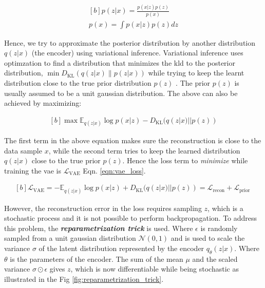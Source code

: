 \begin{equation}\label{eqn:pofx}
    \begin{gathered}[b]
        p(z | x)=\frac{p(x | z) p(z)}{p(x)} \\
        p(x)=\int p(x | z) p(z) dz
    \end{gathered}
\end{equation}

Hence, we try to approximate the posterior distribution by another distribution $q(z|x)$ (the encoder) using variational inference. Variational inference uses optimzation to find a distribution that minimizes the \ac{kld} to the posterior distribution, $\min D_{\mathrm{KL}}(q(z| x) \| p(z| x))$ while trying to keep the learnt distribution close to the true prior distribution $p(z)$ \cite{variational_inference}. The prior $p(z)$ is usually assumed to be a unit gaussian distribution. The above can also be achieved by maximizing:

\begin{equation} \label{eqn:minKLd}
    \begin{gathered}[b]
        \max \mathbb{E}_{q(z | x)} \log p(x | z) - D_{\mathrm{KL}}(q(z | x) || p(z))
    \end{gathered}
\end{equation}

The first term in the above equation makes sure the reconstruction is close to the data sample $x$, while the second term tries to keep the learned distribution $q(z|x)$ close to the true prior $p(z)$. Hence the loss term to \textit{minimize} while training the \ac{vae} is $\mathcal{L}_{\mathrm{VAE}}$ Eqn. \ref{eqn:vae_loss}.

\begin{equation} \label{eqn:vae_loss}
    \begin{gathered}[b]
        \mathcal{L}_{\mathrm{VAE}}=-\mathbb{E}_{q(z | x)} \log p(x | z) + D_{\mathrm{KL}}(q(z | x) || p(z)) =\mathcal{L}_{\text {recon}} +\mathcal{L}_{\text {prior }}
    \end{gathered}
\end{equation}

However, the reconstruction error in the loss requires sampling $z$, which is a stochastic process and it is not possible to perform backpropagation. To address this problem, the \textbf{\textit{reparametrization trick}} is used. Where $\epsilon$ is randomly sampled from a unit gaussian distribution $\mathcal{N}(0,1)$ and is used to scale the variance $\sigma$ of the latent distribution represented by the encoder $q_{\theta}(z|x)$. Where $\theta$ is the parameters of the encoder. The sum of the mean $\mu$ and the scaled variance $\sigma \odot \epsilon$ gives $z$, which is now differentiable while being stochastic as illustrated in the Fig \ref{fig:reparametrization_trick}.

